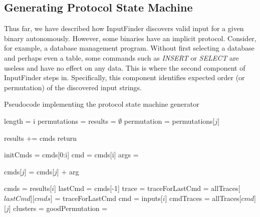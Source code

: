 \documentclass{acm_proc_article-sp}
\def \tool {InputFinder}
\begin{document}
\subsection{Generating Protocol State Machine}
Thus far, we have described how \tool{} discovers valid input for a given binary autonomously.
However, some binaries have an implicit protocol.
Consider, for example, a database management program.
Without first selecting a database and perhaps even a table, some commands such as \textit{INSERT} or \textit{SELECT} are useless and have no effect on any data.
This is where the second component of \tool{} steps in.
Specifically, this component identifies expected order (or permutation) of the discovered input strings.

\begin{algorithm}
\caption{Pseudocode implementing the protocol state machine generator}
\label{psmcode}
\begin{algorithmic}[1]
\State length = i
\State permutations = 
\State results = $\emptyset$
\State permutation = permutations[$j$]
\State {}
\EndFor
\State {}
\EndFor
\EndProcedure

\State results += cmds
\State return
\EndIf

\State initCmds = cmds[0:i]
\State cmd = cmds[i]
\State args = 

\State cmds[$j$] = cmds[$j$] + arg
\State {}
\EndFor
\EndProcedure

\State cmds = results[$i$]
\State lastCmd = cmds[-1]
\State trace = 
\State traceForLastCmd = 
\State allTraces[$lastCmd$][$cmds$] = traceForLastCmd
\EndFor
{}
\State cmd = inputs[$i$]
\State cmdTraces = allTraces[$cmd$][$j$]
\State clusters = 
\State goodPermutation = 
\EndFor
\EndFor
\EndProcedure
\end{algorithmic}
\end{algorithm}
\end{document}
